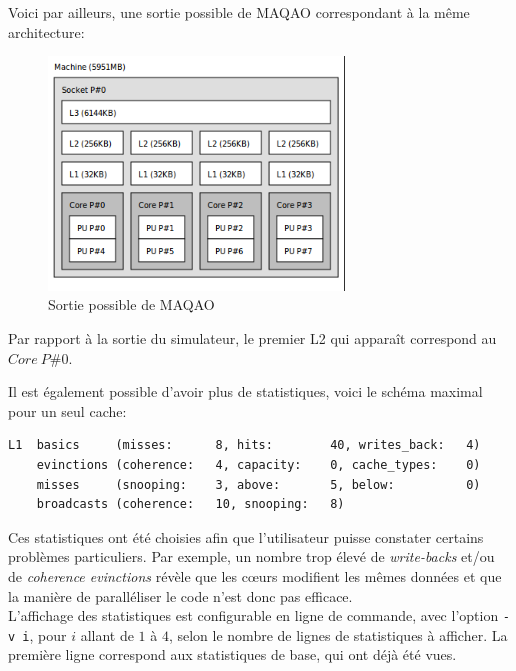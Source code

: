 Voici par ailleurs, une sortie possible de \textsf{MAQAO} correspondant à la même architecture: \\
\begin{figure}[H]
\begin{center}
   \includegraphics[width=0.7\textwidth]{images/lstopo.png}
   \caption{\label{img:archi} Sortie possible de \textsf{MAQAO}}
\end{center}
\end{figure}

Par rapport à la sortie du simulateur, le premier L2 qui apparaît correspond au $Core \ P\#0$.

Il est également possible d'avoir plus de statistiques, voici le schéma maximal pour un seul cache:
\begin{lstlisting}
L1  basics     (misses:      8, hits:        40, writes_back:   4)
    evinctions (coherence:   4, capacity:    0, cache_types:    0)
    misses     (snooping:    3, above:       5, below:          0)
    broadcasts (coherence:   10, snooping:   8)
\end{lstlisting}


Ces statistiques ont été choisies afin que l'utilisateur puisse constater certains problèmes particuliers. Par exemple, un nombre trop élevé de \emph{write-backs} et/ou de \emph{coherence evinctions} révèle que les c\oe urs modifient les mêmes données et que la manière de paralléliser le code n'est donc pas efficace. \\

L'affichage des statistiques est configurable en ligne de commande, avec l'option \texttt{-v i}, pour $i$ allant de $1$ à $4$, selon le nombre de lignes de statistiques à afficher. La première ligne correspond aux statistiques de base, qui ont déjà été vues. \\

